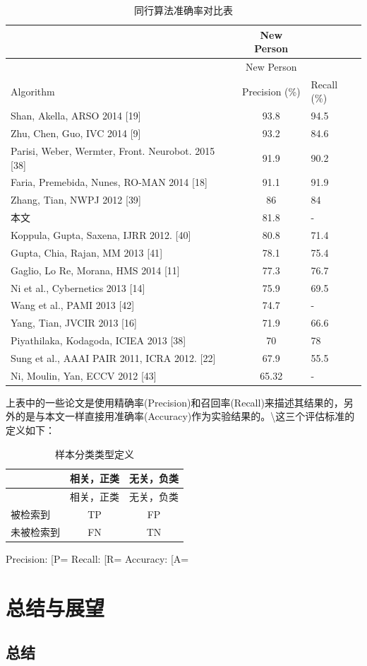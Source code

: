 \begin{longtable}[c]{@{}lcl@{}}
\caption{同行算法准确率对比表}\tabularnewline
\toprule
& New Person &\tabularnewline
\midrule
\endfirsthead
\toprule
& New Person &\tabularnewline
\midrule
\endhead
Algorithm & Precision (\%) & Recall (\%)\tabularnewline
Shan, Akella, ARSO 2014 {[}19{]} & 93.8 & 94.5\tabularnewline
Zhu, Chen, Guo, IVC 2014 {[}9{]} & 93.2 & 84.6\tabularnewline
Parisi, Weber, Wermter, Front. Neurobot. 2015 {[}38{]} & 91.9 &
90.2\tabularnewline
Faria, Premebida, Nunes, RO-MAN 2014 {[}18{]} & 91.1 &
91.9\tabularnewline
Zhang, Tian, NWPJ 2012 {[}39{]} & 86 & 84\tabularnewline
本文 & 81.8 & -\tabularnewline
Koppula, Gupta, Saxena, IJRR 2012. {[}40{]} & 80.8 & 71.4\tabularnewline
Gupta, Chia, Rajan, MM 2013 {[}41{]} & 78.1 & 75.4\tabularnewline
Gaglio, Lo Re, Morana, HMS 2014 {[}11{]} & 77.3 & 76.7\tabularnewline
Ni et al., Cybernetics 2013 {[}14{]} & 75.9 & 69.5\tabularnewline
Wang et al., PAMI 2013 {[}42{]} & 74.7 & -\tabularnewline
Yang, Tian, JVCIR 2013 {[}16{]} & 71.9 & 66.6\tabularnewline
Piyathilaka, Kodagoda, ICIEA 2013 {[}38{]} & 70 & 78\tabularnewline
Sung et al., AAAI PAIR 2011, ICRA 2012. {[}22{]} & 67.9 &
55.5\tabularnewline
Ni, Moulin, Yan, ECCV 2012 {[}43{]} & 65.32 & -\tabularnewline
\bottomrule
\end{longtable}

上表中的一些论文是使用精确率(Precision)和召回率(Recall)来描述其结果的，另外的是与本文一样直接用准确率(Accuracy)作为实验结果的。\textbackslash{}这三个评估标准的定义如下：

\begin{longtable}[c]{@{}lcc@{}}
\caption{样本分类类型定义}\tabularnewline
\toprule
& 相关，正类 & 无关，负类\tabularnewline
\midrule
\endfirsthead
\toprule
& 相关，正类 & 无关，负类\tabularnewline
\midrule
\endhead
被检索到 & TP & FP\tabularnewline
未被检索到 & FN & TN\tabularnewline
\bottomrule
\end{longtable}

Precision: {[}P=\frac{TP}{TP+FP}{]} Recall: {[}R=\frac{TP}{TP+FN}{]}
Accuracy: {[}A=\frac{TP+TN}{TP+FP+FN+TN}{]}

\section{总结与展望}\label{ux603bux7ed3ux4e0eux5c55ux671b}

\subsection{总结}\label{ux603bux7ed3}

